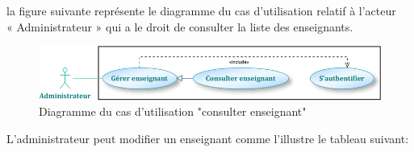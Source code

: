 \documentclass[12 pt]{report}
\begin{document}
la figure suivante représente le diagramme du cas d’utilisation  relatif à l’acteur \\« Administrateur » qui a le droit de consulter la liste des enseignants.
\begin{figure}[h]
 \begin{center}
\includegraphics[width=13 cm ,height=2 cm]{a4.PNG}
\caption{Diagramme du cas d’utilisation "consulter enseignant"}
\end{center}
\end{figure}
\newpage
L'administrateur peut modifier un enseignant comme l'illustre le tableau suivant: 
\end{document}
